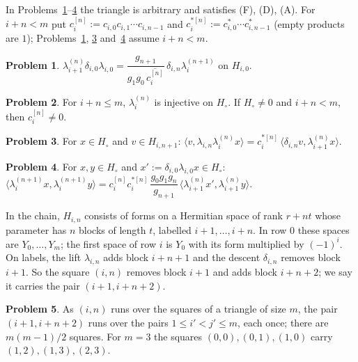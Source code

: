 \documentclass[reqno]{amsart}
\theoremstyle{definition}
\newtheorem{problem}{Problem}[section]
\theoremstyle{plain}
\newcommand{\Hc}{H_\circ}
\begin{document}
In Problems~\ref{pr:row-commute}--\ref{pr:shorten} the triangle is arbitrary and satisfies (F), (D), (A).  For \(i + n < m\) put \(c_i^{[n]} := c_{i,0}c_{i,1}\cdots c_{i,n-1}\) and \(c_i^{*[n]} := c^*_{i,0}\cdots c^*_{i,n-1}\) (empty products are \(1\)); Problems~\ref{pr:row-commute}, \ref{pr:row-adjoint} and~\ref{pr:shorten} assume \(i + n < m\).

\begin{problem}\label{pr:row-commute}
\(\lambda_{i+1}^{(n)}\delta_{i,0}\lambda_{i,0} = \dfrac{g_{n+1}}{g_1g_0\,\overline{c_i^{[n]}}}\,\delta_{i,n}\lambda_i^{(n+1)}\) on \(H_{i,0}\).
\end{problem}

\begin{problem}\label{pr:row-injective}
For \(i + n \le m\), \(\lambda_i^{(n)}\) is injective on \(\Hc\).  If \(\Hc \ne 0\) and \(i + n < m\), then \(c_i^{[n]} \ne 0\).
\end{problem}

\begin{problem}\label{pr:row-adjoint}
For \(x \in \Hc\) and \(v \in H_{i,n+1}\): \(\langle v, \lambda_{i,n}\lambda_i^{(n)}x\rangle = c_i^{*[n]}\,\langle \delta_{i,n}v, \lambda_{i+1}^{(n)}x\rangle\).
\end{problem}

\begin{problem}\label{pr:shorten}
For \(x, y \in \Hc\) and \(x' := \delta_{i,0}\lambda_{i,0}x \in \Hc\):
\(\langle \lambda_i^{(n+1)}x, \lambda_i^{(n+1)}y\rangle = c_i^{[n]}c_i^{*[n]}\,\dfrac{g_0g_1g_n}{g_{n+1}}\,\langle \lambda_{i+1}^{(n)}x', \lambda_{i+1}^{(n)}y\rangle\).
\end{problem}

In the chain, \(H_{i,n}\) consists of forms on a Hermitian space of rank \(r + nt\) whose parameter has \(n\) blocks of length \(t\), labelled \(i+1, \dots, i+n\).  In row \(0\) these spaces are \(Y_0, \dots, Y_m\); the first space of row \(i\) is \(Y_0\) with its form multiplied by \((-1)^i\).  On labels, the lift \(\lambda_{i,n}\) adds block \(i+n+1\) and the descent \(\delta_{i,n}\) removes block \(i+1\).  So the square \((i,n)\) removes block \(i+1\) and adds block \(i+n+2\); we say it carries the pair \((i+1, i+n+2)\).

\begin{problem}\label{pr:pairs}
As \((i,n)\) runs over the squares of a triangle of size \(m\), the pair \((i+1, i+n+2)\) runs over the pairs \(1 \le i' < j' \le m\), each once; there are \(m(m-1)/2\) squares.  For \(m = 3\) the squares \((0,0), (0,1), (1,0)\) carry \((1,2), (1,3), (2,3)\).
\end{problem}
\end{document}
